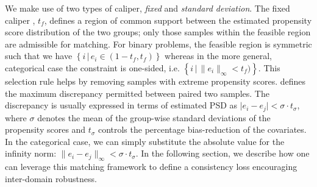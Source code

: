 We make use of two types of caliper, \emph{fixed} and \emph{standard deviation}. The fixed caliper
\citep{crump2009dealing}, $t_f$, defines a region of common support between the estimated propensity
score distribution of the two groups; only those samples within the feasible region are admissible
for matching. For binary problems, the feasible region is symmetric such that we have \( \left\{i
\, | \, e_i \in (1 - t_{f}, t_{f}) \right\} \) whereas in the more general, categorical case the
constraint is one-sided, i.e. \( \left\{i \, | \, \lVert e_i \rVert_{\infty} < t_{f}) \right\} \).
%
This selection rule helps by removing samples with extreme propensity scores.
%
\citet{rosenbaum1985constructing} defines the maximum discrepancy permitted between paired two samples.
%
The discrepancy is usually expressed in terms of estimated PSD as \( \vert e_i - e_j \vert < \sigma
\cdot t_\sigma \), where \(\sigma\) denotes the mean of the group-wise standard deviations of the
propensity scores and \(t_\sigma\) controls the percentage bias-reduction of the
covariates. 
%
In the categorical case, we can simply substitute the absolute value for the infinity norm: \(
\lVert e_i - e_j \rVert_\infty < \sigma \cdot t_\sigma \).
%
In the following section, we describe how one can leverage this matching framework to define a
consistency loss encouraging inter-domain robustness.
